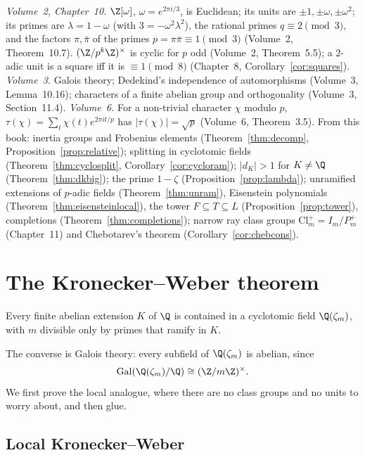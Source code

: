 \begin{reminder}
\emph{Volume~2, Chapter~10.} $\Z[\omega]$, $\omega=e^{2\pi i/3}$, is Euclidean; its units are $\pm1,\pm\omega,\pm\omega^2$; its primes are
$\lambda=1-\omega$ (with $3=-\omega^2\lambda^2$), the rational primes $q\equiv2\pmod3$, and the factors $\pi,\bar\pi$ of the primes
$p=\pi\bar\pi\equiv1\pmod3$ (Volume~2, Theorem~10.7). $(\Z/p^k\Z)^\times$ is cyclic for $p$ odd (Volume~2, Theorem~5.5); a $2$-adic unit is a
square iff it is $\equiv1\pmod8$ (Chapter~8, Corollary~\ref{cor:squares}). \emph{Volume~3.} Galois theory; Dedekind's independence of automorphisms
(Volume~3, Lemma~10.16); characters of a finite abelian group and orthogonality (Volume~3, Section~11.4). \emph{Volume~6.} For a non-trivial
character $\chi$ modulo $p$, $\tau(\chi)=\sum_t\chi(t)e^{2\pi it/p}$ has $|\tau(\chi)|=\sqrt p$ (Volume~6, Theorem~3.5). From this book:
inertia groups and Frobenius elements (Theorem~\ref{thm:decomp}, Proposition~\ref{prop:relative}); splitting in cyclotomic fields
(Theorem~\ref{thm:cyclosplit}, Corollary~\ref{cor:cycloram}); $|d_K|>1$ for $K\ne\Q$ (Theorem~\ref{thm:dkbig}); the prime $1-\zeta$
(Proposition~\ref{prop:lambda}); unramified extensions of $p$-adic fields (Theorem~\ref{thm:unram}), Eisenstein polynomials
(Theorem~\ref{thm:eisensteinlocal}), the tower $F\subseteq T\subseteq L$ (Proposition~\ref{prop:tower}), completions
(Theorem~\ref{thm:completions}); narrow ray class groups $\mathrm{Cl}_m^+=I_m/P_m^+$ (Chapter~11) and Chebotarev's theorem
(Corollary~\ref{cor:chebcons}).
\end{reminder}

\section{The Kronecker--Weber theorem}

\begin{theorem}\label{thm:kw}
Every finite abelian extension $K$ of $\Q$ is contained in a cyclotomic field $\Q(\zeta_m)$, with $m$ divisible only by primes that
ramify in $K$.
\end{theorem}

The converse is Galois theory: every subfield of $\Q(\zeta_m)$ is abelian, since
\[
\operatorname{Gal}(\Q(\zeta_m)/\Q)\cong(\Z/m\Z)^\times.
\]
We
first prove the local analogue, where there are no class groups and no units to worry about, and then glue.

\subsection*{Local Kronecker--Weber}

